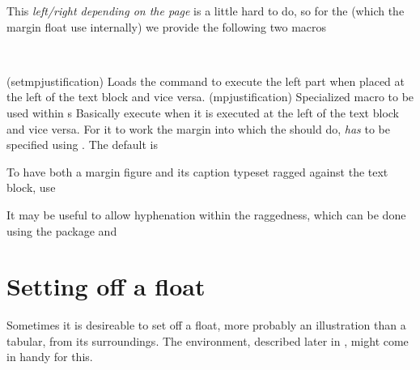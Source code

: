 This \emph{left/right depending on the page} is a little hard to do,
so for the \cmd{\marginpar} (which the margin float use internally) we
provide the following two macros
\begin{syntax}
  \cmd{\setmpjustification}\\
  \cmd{\mpjustification}
\end{syntax}
\glossary(setmpjustification)%
  {}%
  {Loads the  command to execute the left part
    when placed at the left of the text block and vice versa.}%
\glossary(mpjustification)%
  {}%
  {Specialized macro to be used within s}
Basically \cmd{\mpjustification} execute 
when it is executed at the left of the text block and vice versa. For
it to work the margin into which the  should do,
\emph{has} to be specified using . The default is
\begin{lcode}
  \setmpjustification{\raggedleft}{\raggedright}
\end{lcode}
To have both a margin figure and its caption typeset ragged against
the text block, use
\begin{lcode}
\end{lcode}
It may be useful to allow hyphenation within the raggedness, which can
be done using the  package and
\begin{lcode}
  \setmpjustification{\RaggedLeft}{\RaggedRight}
\end{lcode}








\section{Setting off a float} \label{sec:floatsetoff}


    Sometimes it is desireable to set off a float, more probably
an illustration than a tabular, from its surroundings. The 
environment, described later in , might come in handy 
for this.

